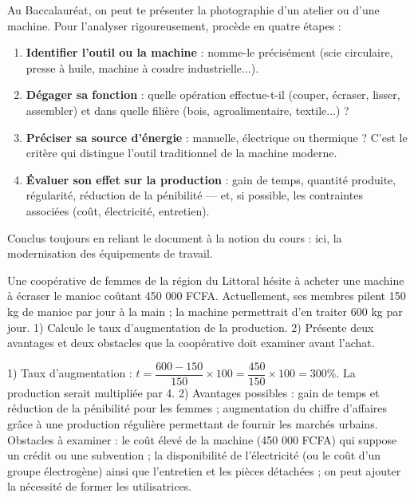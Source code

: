 \documentclass[11pt]{article}
\begin{document}
\begin{methode}
Au Baccalauréat, on peut te présenter la photographie d'un atelier ou d'une machine. Pour l'analyser rigoureusement, procède en quatre étapes :
\begin{enumerate}
\item \textbf{Identifier l'outil ou la machine} : nomme-le précisément (scie circulaire, presse à huile, machine à coudre industrielle...).
\item \textbf{Dégager sa fonction} : quelle opération effectue-t-il (couper, écraser, lisser, assembler) et dans quelle filière (bois, agroalimentaire, textile...) ?
\item \textbf{Préciser sa source d'énergie} : manuelle, électrique ou thermique ? C'est le critère qui distingue l'outil traditionnel de la machine moderne.
\item \textbf{Évaluer son effet sur la production} : gain de temps, quantité produite, régularité, réduction de la pénibilité — et, si possible, les contraintes associées (coût, électricité, entretien).
\end{enumerate}
Conclus toujours en reliant le document à la notion du cours : ici, la modernisation des équipements de travail.
\end{methode}

\begin{exercice}
Une coopérative de femmes de la région du Littoral hésite à acheter une machine à écraser le manioc coûtant 450 000 FCFA. Actuellement, ses membres pilent 150 kg de manioc par jour à la main ; la machine permettrait d'en traiter 600 kg par jour. 1) Calcule le taux d'augmentation de la production. 2) Présente deux avantages et deux obstacles que la coopérative doit examiner avant l'achat.
\end{exercice}

\begin{corrige}
1) Taux d'augmentation : $t = \dfrac{600 - 150}{150} \times 100 = \dfrac{450}{150} \times 100 = 300\%$. La production serait multipliée par 4.
2) Avantages possibles : gain de temps et réduction de la pénibilité pour les femmes ; augmentation du chiffre d'affaires grâce à une production régulière permettant de fournir les marchés urbains. Obstacles à examiner : le coût élevé de la machine (450 000 FCFA) qui suppose un crédit ou une subvention ; la disponibilité de l'électricité (ou le coût d'un groupe électrogène) ainsi que l'entretien et les pièces détachées ; on peut ajouter la nécessité de former les utilisatrices.
\end{corrige}
\end{document}
